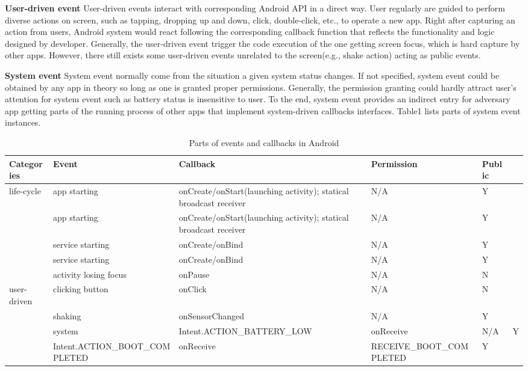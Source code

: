 \textbf{User-driven event} User-driven events interact with corresponding Android API in a direct way. User regularly are guided to perform diverse actions on screen, such as tapping, dropping up and down, click, double-click, etc., to operate a new app. Right after capturing an action from users, Android system would react following the  corresponding callback function that reflects the functionality and logic designed by developer. Generally, the user-driven event trigger the code execution of the one getting screen focus, which is hard capture by other apps. However, there still exists some user-driven events unrelated to the screen(e.g., shake action) acting as public events. 

\textbf{System event} System event normally come from the situation a given system status changes. If not specified, system event could be obtained by any app in theory so long as one is granted proper permissions. Generally, the permission granting could hardly attract user's attention for system event such as battery status is insensitive to user. To the end, system event provides an indirect entry for adversary app getting parts of the running process of other apps that implement system-driven callbacks interfaces. Table1 lists parts of system event instances.

\begin{table*}[t]
\centering
 \caption{\label{tab:test}Parts of events and callbacks in Android}
 \begin{tabularx}{\linewidth}{XXXXX} 
  \toprule
  Categories & Event & Callback & Permission & Public \\
  \midrule
  life-cycle & app starting & onCreate/onStart(launching activity); statical broadcast receiver & N/A & Y\\
  			 & app starting & onCreate/onStart(launching activity); statical broadcast receiver & N/A & Y\\                      
             & service starting & onCreate/onBind & N/A & Y\\
             & service starting & onCreate/onBind & N/A & Y\\
             
             & activity losing focus & onPause & N/A & N\\
             
  user-driven & clicking button & onClick & N/A & N\\
              & shaking & onSensorChanged & N/A & Y\\
              & 
              
  system  & Intent.ACTION\_BATTERY\_LOW & onReceive & N/A & Y \\
          & Intent.ACTION\_BOOT\_COMPLETED & onReceive & RECEIVE\_BOOT\_COMPLETED & Y \\
  
  \bottomrule
 \end{tabularx}
\end{table*}

